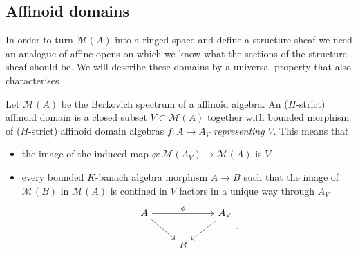 \subsection{Affinoid domains} \label{sec:affinoid_domains}

In order to turn $\mathcal{M} (A)$ into a ringed space and define a structure sheaf we need an analogue of affine opens on which we know what the sections of the structure sheaf should be. 
We will describe these domains by a universal property that also characterises 

\begin{definition}
	Let $\mathcal{M} (A)$ be the Berkovich spectrum of a affinoid algebra. 
	An ($H$-strict) affinoid domain is a closed subset $V \subset  \mathcal{M} (A)$ together with bounded morphism of ($H$-strict) affinoid domain algebras $f:A \to A_V$ \emph{representing} $V$.
	This means that 
	\begin{itemize}
		\item the image of the induced map $\phi:\mathcal{M} (A_V) \to \mathcal{M} (A)$ is $V$ 
		\item every bounded $K$-banach algebra morphism $A \to B$ such that the image of $\mathcal{M} (B)$ in $\mathcal{M} (A)$ is contined in $V$ factors in a unique way through $A_V$ \[
	\begin{tikzcd}
		A \ar{rr}{\phi} \ar{dr}& & A_V \ar[dashed]{dl} \\
				& B
	\end{tikzcd}
	.\] 
	\end{itemize}
\end{definition}


